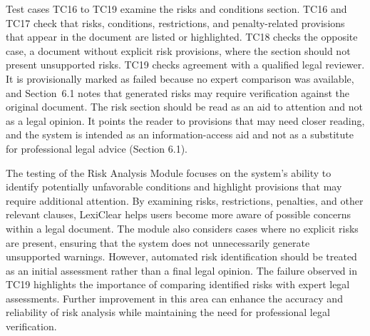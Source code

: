 \documentclass[12pt,a4paper,oneside]{report}
\begin{document}
Test cases TC16 to TC19 examine the risks and conditions section. TC16 and TC17 check that risks, conditions, restrictions, and penalty-related provisions that appear in the document are listed or highlighted. TC18 checks the opposite case, a document without explicit risk provisions, where the section should not present unsupported risks. TC19 checks agreement with a qualified legal reviewer. It is provisionally marked as failed because no expert comparison was available, and Section~6.1 notes that generated risks may require verification against the original document. The risk section should be read as an aid to attention and not as a legal opinion. It points the reader to provisions that may need closer reading, and the system is intended as an information-access aid and not as a substitute for professional legal advice (Section 6.1).

The testing of the Risk Analysis Module focuses on the system's ability to identify potentially unfavorable conditions and highlight provisions that may require additional attention. By examining risks, restrictions, penalties, and other relevant clauses, LexiClear helps users become more aware of possible concerns within a legal document. The module also considers cases where no explicit risks are present, ensuring that the system does not unnecessarily generate unsupported warnings. However, automated risk identification should be treated as an initial assessment rather than a final legal opinion. The failure observed in TC19 highlights the importance of comparing identified risks with expert legal assessments. Further improvement in this area can enhance the accuracy and reliability of risk analysis while maintaining the need for professional legal verification.

\end{document}
